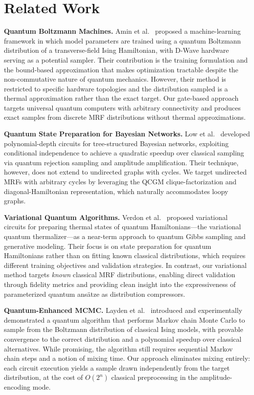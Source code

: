\documentclass[conference,10pt]{IEEEtran}
\begin{document}
\section{Related Work}

\textbf{Quantum Boltzmann Machines.} Amin et al.~\cite{amin2018qbm} proposed a
machine-learning framework in which model parameters are trained using a quantum
Boltzmann distribution of a transverse-field Ising Hamiltonian, with D-Wave
hardware serving as a potential sampler. Their contribution is the training
formulation and the bound-based approximation that makes optimization
tractable despite the non-commutative nature of quantum mechanics. However, their
method is restricted to specific hardware topologies and the distribution sampled
is a thermal approximation rather than the exact target. Our gate-based approach
targets universal quantum computers with arbitrary connectivity and produces exact
samples from discrete MRF distributions without thermal approximations.

\textbf{Quantum State Preparation for Bayesian Networks.} Low et al.~\cite{low2014bayes} developed polynomial-depth circuits for tree-structured Bayesian networks, exploiting conditional independence to achieve a quadratic speedup over classical sampling via quantum rejection sampling and amplitude amplification. Their technique, however, does not extend to undirected graphs with cycles. We target undirected MRFs with arbitrary cycles by leveraging the QCGM clique-factorization and diagonal-Hamiltonian representation, which naturally accommodates loopy graphs.

\textbf{Variational Quantum Algorithms.} Verdon et al.~\cite{verdon2019vqe} proposed
variational circuits for preparing thermal states of quantum Hamiltonians---the
variational quantum thermalizer---as a near-term approach to quantum Gibbs
sampling and generative modeling. Their focus is on state preparation for quantum
Hamiltonians rather than on fitting known classical distributions, which requires
different training objectives and validation strategies. In contrast, our variational
method targets \emph{known} classical MRF distributions, enabling direct validation
through fidelity metrics and providing clean insight into the expressiveness of
parameterized quantum ans\"atze as distribution compressors.

\textbf{Quantum-Enhanced MCMC.} Layden et al.~\cite{layden2023qemcmc} introduced and
experimentally demonstrated a quantum algorithm that performs Markov chain Monte
Carlo to sample from the Boltzmann distribution of classical Ising models, with
provable convergence to the correct distribution and a polynomial speedup over
classical alternatives. While promising, the algorithm still requires sequential
Markov chain steps and a notion of mixing time. Our approach eliminates mixing
entirely: each circuit execution yields a sample drawn independently from the
target distribution, at the cost of $O(2^n)$ classical preprocessing in the
amplitude-encoding mode.
\end{document}
